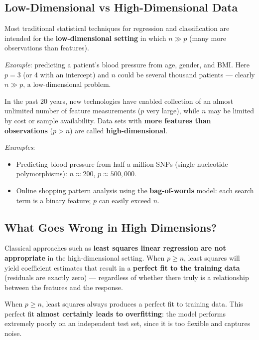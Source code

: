 \documentclass[11pt,a4paper]{article}
\theoremstyle{definition}
\theoremstyle{plain}
\theoremstyle{remark}
\begin{document}
\subsection{Low-Dimensional vs High-Dimensional Data}

Most traditional statistical techniques for regression and classification are intended for the \textbf{low-dimensional setting} in which $n \gg p$ (many more observations than features).

\textit{Example}: predicting a patient's blood pressure from age, gender, and BMI. Here $p = 3$ (or 4 with an intercept) and $n$ could be several thousand patients — clearly $n \gg p$, a low-dimensional problem.

In the past 20 years, new technologies have enabled collection of an almost unlimited number of feature measurements ($p$ very large), while $n$ may be limited by cost or sample availability. Data sets with \textbf{more features than observations} ($p > n$) are called \textbf{high-dimensional}.

\textit{Examples}:
\begin{itemize}
    \item Predicting blood pressure from half a million SNPs (single nucleotide polymorphisms): $n \approx 200$, $p \approx 500{,}000$.
    \item Online shopping pattern analysis using the \textbf{bag-of-words} model: each search term is a binary feature; $p$ can easily exceed $n$.
\end{itemize}

\subsection{What Goes Wrong in High Dimensions?}

Classical approaches such as \textbf{least squares linear regression are not appropriate} in the high-dimensional setting. When $p \geq n$, least squares will yield coefficient estimates that result in a \textbf{perfect fit to the training data} (residuals are exactly zero) — regardless of whether there truly is a relationship between the features and the response.

\begin{tcolorbox}[colback=orange!5!white,colframe=orange!75!black,title=\textbf{The High-Dimensional Danger}]
When $p \geq n$, least squares always produces a perfect fit to training data. This perfect fit \textbf{almost certainly leads to overfitting}: the model performs extremely poorly on an independent test set, since it is too flexible and captures noise.
\end{tcolorbox}
\end{document}
